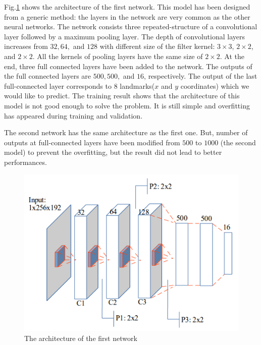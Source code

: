 \documentclass[conference]{IEEEtran}
\begin{document}
Fig.\ref{figarch0} shows the architecture of the first network. This model has been designed from a generic method: the layers in the network are very common as the other neural networks. The network consists three repeated-structure of a convolutional layer followed by a maximum pooling layer. The depth of convolutional layers increases from $32, 64,$ and $128$ with different size of the filter kernel: $3 \times 3$, $2 \times 2$, and $2 \times 2$. All the kernels of pooling layers have the same size of $2 \times 2$.  At the end, three full connected layers have been added to the network. The outputs of the full connected layers are $500, 500,$ and $16$, respectively. The output of the last full-connected layer corresponds to 8 landmarks($x$ and $y$ coordinates) which we would like to predict. The training result shows that the architecture of this model is not good enough to solve the problem. It is still simple and overfitting has appeared during training and validation. 

The second network has the same architecture as the first one. But, number of outputs at full-connected layers have been modified from $500$ to $1000$ (the second model) to prevent the overfitting, but the result did not lead to better performances. 

\begin{figure}[htbp]
	\centerline{\includegraphics[scale=0.45]{images/architecture1}}
	\caption{The architecture of the first network}
	\label{figarch0}
\end{figure}
\end{document}
